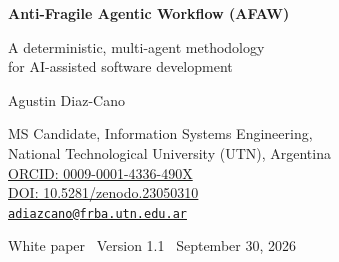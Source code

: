 \documentclass[11pt,a4paper]{article}
\begin{document}
\begin{center}
  {\sffamily\bfseries\huge Anti-Fragile Agentic Workflow (AFAW)\par}
  \vspace{0.5em}
  {\sffamily\Large A deterministic, multi-agent methodology\\ for AI-assisted software development\par}
  \vspace{1.2em}
  {\large Agustin Diaz-Cano\par}
  \vspace{0.3em}
  {\small MS Candidate, Information Systems Engineering,\\ National Technological University (UTN), Argentina\\[4pt]
  \href{https://orcid.org/0009-0001-4336-490X}{ORCID: 0009-0001-4336-490X}\\[2pt]
  \href{https://doi.org/10.5281/zenodo.23050310}{DOI: 10.5281/zenodo.23050310}\\[2pt]
  \href{mailto:adiazcano@frba.utn.edu.ar}{\texttt{adiazcano@frba.utn.edu.ar}}\par}
  \vspace{0.6em}
  {\small\sffamily White paper \textbullet\ Version 1.1 \textbullet\ September 30, 2026\par}
\end{center}
\end{document}

